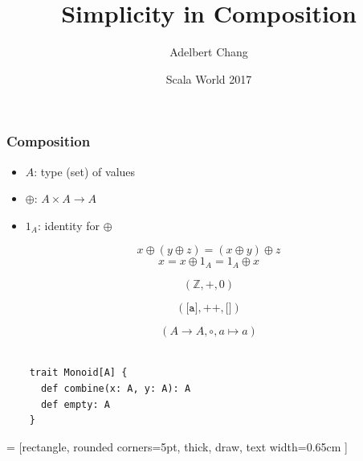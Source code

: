 \documentclass{beamer}
\title{Simplicity in Composition}
\author{Adelbert Chang}
\date{Scala World 2017}
\def\code#1{\texttt{#1}}
\newcommand{\gpause}{\vspace*{-\baselineskip}\pause}
\begin{document}
\frame{\titlepage}

\begin{frame}

  \frametitle{Composition}
  \large

  \begin{itemize}
    \item $A$: type (set) of values \pause
    \item $\oplus$: $A \times A \rightarrow A$ \pause
    \item $1_{A}$: identity for $\oplus$ \pause
  \end{itemize}

  $$x \oplus (y \oplus z) = (x \oplus y) \oplus z$$ \gpause
  $$x = x \oplus 1_{A} = 1_{A} \oplus x$$

\end{frame}

\begin{frame} \Large $$(\mathbb{Z}, +, 0)$$ \end{frame}

\begin{frame} \Large $$(\code{[a]}, +\!\!+, \code{[]})$$ \end{frame}

\begin{frame} \Large $$(A \rightarrow A, \circ, a \mapsto a)$$ \end{frame}

\begin{frame}[fragile]
  \large

  \begin{verbatim}

    trait Monoid[A] {
      def combine(x: A, y: A): A
      def empty: A
    }

  \end{verbatim}

\end{frame}

 = [rectangle, rounded corners=5pt, thick, draw, text width=0.65cm ]


\begin{frame}
  \centering


\end{frame}
\end{document}
